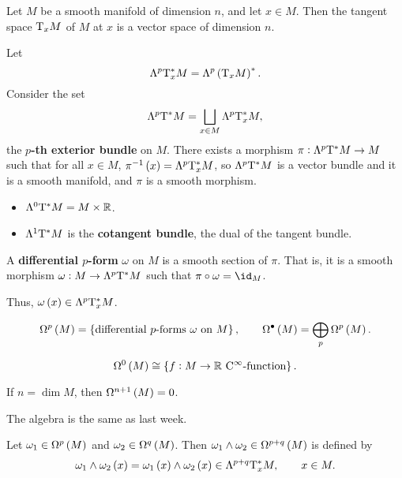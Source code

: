 Let $ M $ be a smooth manifold of dimension $ n $, and let $ x \in M $. Then the tangent space $ \mathrm{T}_xM $ of $ M $ at $ x $ is a vector space of dimension $ n $.

\begin{notation}
Let
$$ \Lambda^p\T_x^*M = \Lambda^p\br{\T_xM}^*. $$
Consider the set
$$ \Lambda^p\mathrm{T}^*M = \bigsqcup_{x \in M} \Lambda^p\mathrm{T}_x^*M, $$
the \textbf{$ p $-th exterior bundle} on $ M $. There exists a morphism $ \pi : \Lambda^p\mathrm{T}^*M \to M $ such that for all $ x \in M $, $ \pi^{-1}\br{x} = \Lambda^p\T_x^*M $, so $ \Lambda^p\mathrm{T}^*M $ is a vector bundle and it is a smooth manifold, and $ \pi $ is a smooth morphism.
\end{notation}

\begin{example}
\hfill
\begin{itemize}
\item $ \Lambda^0\mathrm{T}^*M = M \times \mathbb{R} $.
\item $ \Lambda^1\mathrm{T}^*M $ is the \textbf{cotangent bundle}, the dual of the tangent bundle.
\end{itemize}
\end{example}


\begin{definition}
A \textbf{differential $ p $-form} $ \omega $ on $ M $ is a smooth section of $ \pi $. That is, it is a smooth morphism $ \omega : M \to \Lambda^p\mathrm{T}^*M $ such that $ \pi \circ \omega = \id_M $.
\end{definition}

Thus, $ \omega\br{x} \in \Lambda^p\T_x^*M $.

\begin{notation}
$$ \Omega^p\br{M} = \cbr{\text{differential $ p $-forms} \ \omega \ \text{on} \ M}, \qquad \Omega^\bullet\br{M} = \bigoplus_p \Omega^p\br{M}. $$
\end{notation}

\begin{example}
$$ \Omega^0\br{M} \cong \cbr{f : M \to \RR \ \text{$ \C^\infty $-function}}. $$
\end{example}

\begin{exercise*}
If $ n = \dim M $, then $ \Omega^{n + 1}\br{M} = 0 $.
\end{exercise*}

The algebra is the same as last week.

\begin{definition}
Let $ \omega_1 \in \Omega^p\br{M} $ and $ \omega_2 \in \Omega^q\br{M} $. Then $ \omega_1 \wedge \omega_2 \in \Omega^{p + q}\br{M} $ is defined by
$$ \omega_1 \wedge \omega_2\br{x} = \omega_1\br{x} \wedge \omega_2\br{x} \in \Lambda^{p + q}\T_x^*M, \qquad x \in M. $$
\end{definition}

